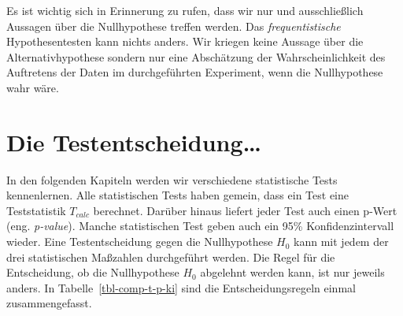\documentclass[
  letterpaper,
  DIV=11,
  oneside]{scrreport}
\begin{document}
{}

Es ist wichtig sich in Erinnerung zu rufen, dass wir nur und
ausschließlich Aussagen über die Nullhypothese treffen werden. Das
\emph{frequentistische} Hypothesentesten kann nichts anders. Wir kriegen
keine Aussage über die Alternativhypothese sondern nur eine Abschätzung
der Wahrscheinlichkeit des Auftretens der Daten im durchgeführten
Experiment, wenn die Nullhypothese wahr wäre.

\hypertarget{die-testentscheidung}{%
\section*{Die Testentscheidung\ldots{}}\label{die-testentscheidung}}

In den folgenden Kapiteln werden wir verschiedene statistische Tests
kennenlernen. Alle statistischen Tests haben gemein, dass ein Test eine
Teststatistik \(T_{calc}\) berechnet. Darüber hinaus liefert jeder Test
auch einen p-Wert (eng. \emph{p-value}). Manche statistischen Test geben
auch ein 95\% Konfidenzintervall wieder. Eine Testentscheidung gegen die
Nullhypothese \(H_0\) kann mit jedem der drei statistischen Maßzahlen
durchgeführt werden. Die Regel für die Entscheidung, ob die
Nullhypothese \(H_0\) abgelehnt werden kann, ist nur jeweils anders. In
Tabelle~\ref{tbl-comp-t-p-ki} sind die Entscheidungsregeln einmal
zusammengefasst.
\end{document}
